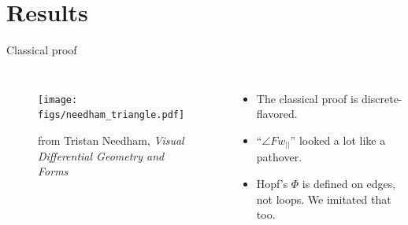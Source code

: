 \documentclass[14pt,aspectratio=169]{beamer}
\begin{document}
\begin{frame}

\end{frame}

\section{Results}

\begin{frame}{Classical proof}
\begin{columns}
\begin{figure}
\texttt{[image: figs/needham\_triangle.pdf]}
\caption{from Tristan Needham, \emph{Visual Differential Geometry and Forms}}
\end{figure}
\begin{itemize}
\item The classical proof is discrete-flavored.
\item ``\( \angle Fw_{||} \)'' looked a lot like a pathover.
\item Hopf's \( \Phi \) is defined on edges, not loops. We imitated that too.
\end{itemize}
\end{columns}
\end{frame}
\end{document}
